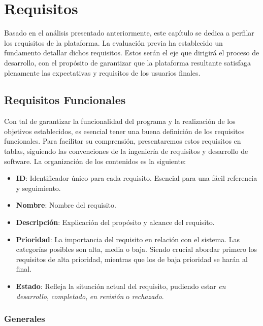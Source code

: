 \chapter{Requisitos} \label{chap:requisitos}

Basado en el análisis presentado anteriormente, este capítulo se dedica a perfilar los requisitos de la plataforma. La evaluación previa ha establecido un fundamento detallar dichos requisitos. Estos serán el eje que dirigirá el proceso de desarrollo, con el propósito de garantizar que la plataforma resultante satisfaga plenamente las expectativas y requisitos de los usuarios finales.

\section{Requisitos Funcionales}

Con tal de garantizar la funcionalidad del programa y la realización de los objetivos establecidos, es esencial tener una buena definición de los requisitos funcionales. Para facilitar su comprensión, presentaremos estos requisitos en tablas, siguiendo las convenciones de la ingeniería de requisitos y desarrollo de software. La organización de los contenidos es la siguiente:

\begin{itemize}
    \item \textbf{ID}: Identificador único para cada requisito. Esencial para una fácil referencia y seguimiento.
    \item \textbf{Nombre}: Nombre del requisito.
    \item \textbf{Descripción}: Explicación del propósito y alcance del requisito.
    \item \textbf{Prioridad}: La importancia del requisito en relación con el sistema. Las categorías posibles son alta, media o baja. Siendo crucial abordar primero los requisitos de alta prioridad, mientras que los de baja prioridad se harán al final.
    \item \textbf{Estado}: Refleja la situación actual del requisito, pudiendo estar \textit{en desarrollo}, \textit{completado}, \textit{en revisión} o \textit{rechazado}.
\end{itemize}


\subsection{Generales}

